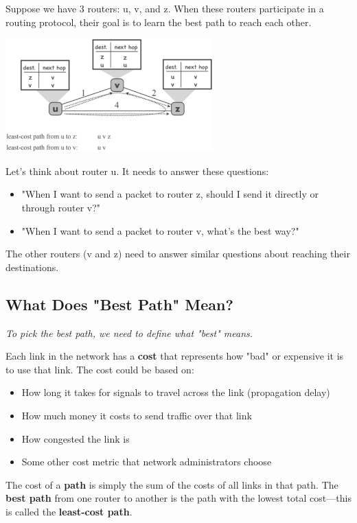 \documentclass[../../compsys.tex]{subfiles}
\begin{document}
Suppose we have 3 routers: u, v, and z. When these routers participate in a routing protocol, their goal is to learn the best path to reach each other.

\begin{center}
    \includegraphics[width=0.6\textwidth]{images/example-table-routers.png}
\end{center}

Let's think about router u. It needs to answer these questions:
\begin{itemize}
    \item "When I want to send a packet to router z, should I send it directly or through router v?"
    \item "When I want to send a packet to router v, what's the best way?"
\end{itemize}

The other routers (v and z) need to answer similar questions about reaching their destinations.

\subsection{What Does "Best Path" Mean?}
\textit{To pick the best path, we need to define what "best" means.}

Each link in the network has a \textbf{cost} that represents how "bad" or expensive it is to use that link. The cost could be based on:
\begin{itemize}
    \item How long it takes for signals to travel across the link (propagation delay)
    \item How much money it costs to send traffic over that link
    \item How congested the link is
    \item Some other cost metric that network administrators choose
\end{itemize}

The cost of a \textbf{path} is simply the sum of the costs of all links in that path. The \textbf{best path} from one router to another is the path with the lowest total cost—this is called the \textbf{least-cost path}.
\end{document}
